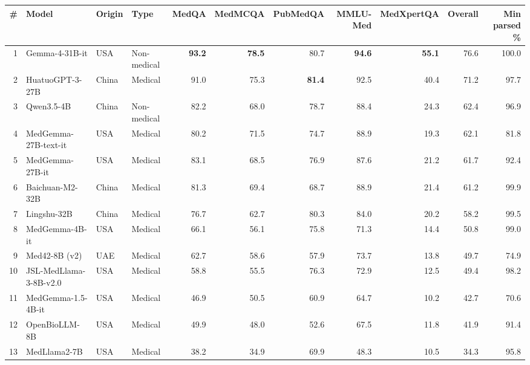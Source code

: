 \begin{tabular}{@{}rlllrrrrrrr@{}}
\toprule
\# & Model & Origin & Type & MedQA & MedMCQA & PubMedQA & MMLU-Med & MedXpertQA & Overall & Min parsed \% \\
\midrule
1 & Gemma-4-31B-it & USA & Non-medical & \textbf{93.2} & \textbf{78.5} & 80.7 & \textbf{94.6} & \textbf{55.1} & 76.6 & 100.0 \\
2 & HuatuoGPT-3-27B & China & Medical & 91.0 & 75.3 & \textbf{81.4} & 92.5 & 40.4 & 71.2 & 97.7 \\
3 & Qwen3.5-4B & China & Non-medical & 82.2 & 68.0 & 78.7 & 88.4 & 24.3 & 62.4 & 96.9 \\
4 & MedGemma-27B-text-it & USA & Medical & 80.2 & 71.5 & 74.7 & 88.9 & 19.3 & 62.1 & 81.8 \\
5 & MedGemma-27B-it & USA & Medical & 83.1 & 68.5 & 76.9 & 87.6 & 21.2 & 61.7 & 92.4 \\
6 & Baichuan-M2-32B & China & Medical & 81.3 & 69.4 & 68.7 & 88.9 & 21.4 & 61.2 & 99.9 \\
7 & Lingshu-32B & China & Medical & 76.7 & 62.7 & 80.3 & 84.0 & 20.2 & 58.2 & 99.5 \\
8 & MedGemma-4B-it & USA & Medical & 66.1 & 56.1 & 75.8 & 71.3 & 14.4 & 50.8 & 99.0 \\
9 & Med42-8B (v2) & UAE & Medical & 62.7 & 58.6 & 57.9 & 73.7 & 13.8 & 49.7 & 74.9 \\
10 & JSL-MedLlama-3-8B-v2.0 & USA & Medical & 58.8 & 55.5 & 76.3 & 72.9 & 12.5 & 49.4 & 98.2 \\
11 & MedGemma-1.5-4B-it & USA & Medical & 46.9 & 50.5 & 60.9 & 64.7 & 10.2 & 42.7 & 70.6 \\
12 & OpenBioLLM-8B & USA & Medical & 49.9 & 48.0 & 52.6 & 67.5 & 11.8 & 41.9 & 91.4 \\
13 & MedLlama2-7B & USA & Medical & 38.2 & 34.9 & 69.9 & 48.3 & 10.5 & 34.3 & 95.8 \\
\bottomrule
\end{tabular}
